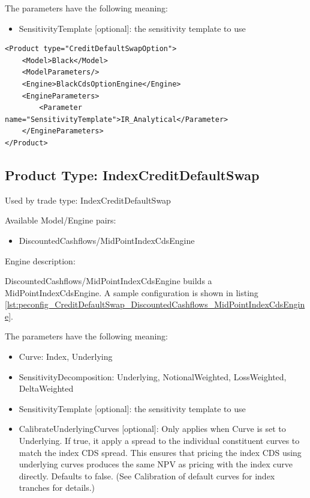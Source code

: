 The parameters have the following meaning:

\begin{itemize}
\item SensitivityTemplate [optional]: the sensitivity template to use
\end{itemize}

\begin{longlisting}
\begin{verbatim}
<Product type="CreditDefaultSwapOption">
    <Model>Black</Model>
    <ModelParameters/>
    <Engine>BlackCdsOptionEngine</Engine>
    <EngineParameters>
        <Parameter name="SensitivityTemplate">IR_Analytical</Parameter>
    </EngineParameters>
</Product>
\end{verbatim}
\caption{Configuration for Product CreditDefaultSwap, Model DiscountedCashflows, Engine MidPointCdsEngine}
\label{lst:peconfig_CreditDefaultSwapOption_Black_BlackCdsOptionEngine}
\end{longlisting}

\subsection{Product Type: IndexCreditDefaultSwap}

Used by trade type: IndexCreditDefaultSwap

Available Model/Engine pairs:

\begin{itemize}
\item DiscountedCashflows/MidPointIndexCdsEngine
\end{itemize}

Engine description:

DiscountedCashflows/MidPointIndexCdsEngine builds a MidPointIndexCdsEngine. A sample configuration is shown in listing
\ref{lst:peconfig_CreditDefaultSwap_DiscountedCashflows_MidPointIndexCdsEngine}.

The parameters have the following meaning:

\begin{itemize}
\item Curve: Index, Underlying
\item SensitivityDecomposition: Underlying, NotionalWeighted, LossWeighted, DeltaWeighted
\item SensitivityTemplate [optional]: the sensitivity template to use
\item CalibrateUnderlyingCurves [optional]: Only applies when Curve is set to Underlying.
If true, it apply a spread to the individual constituent curves to match the index CDS spread.
This ensures that pricing the index CDS using underlying curves produces the same NPV as pricing with the index curve directly. Defaults to false.
(See Calibration of default curves for index tranches for details.)
\end{itemize}

